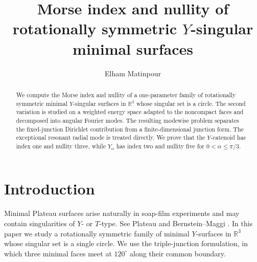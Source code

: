 \documentclass[11pt,twoside]{amsart}
\numberwithin{equation}{section}
\begin{document}

\pagestyle{myheadings}


\bigskip
\bigskip

\title{Morse index and nullity of rotationally symmetric \texorpdfstring{$Y$}{Y}-singular minimal surfaces}

\author{Elham Matinpour}
\address{Department of Mathematics, Johns Hopkins University, 3400 N. Charles Street, Baltimore, MD 21218}


\begin{abstract}
We compute the Morse index and nullity of a one-parameter family of rotationally symmetric minimal $Y$-singular surfaces in $\mathbb R^3$ whose singular set is a circle. The second variation is studied on a weighted energy space adapted to the noncompact faces and decomposed into angular Fourier modes. The resulting modewise problem separates the fixed-junction Dirichlet contribution from a finite-dimensional junction form. The exceptional resonant radial mode is treated directly. We prove that the $Y$-catenoid has index one and nullity three, while $Y_\alpha$ has index two and nullity five for $0<\alpha\leq\pi/3$.
\end{abstract}

\maketitle

\section{Introduction}
Minimal Plateau surfaces arise naturally in soap-film experiments and may contain singularities of $Y$- or $T$-type. See Plateau \cite{plateau1873statique} and Bernstein--Maggi \cite{bernstein2021symmetry}. In this paper we study a rotationally symmetric family of minimal $Y$-surfaces in $\mathbb R^3$ whose singular set is a single circle. We use the triple-junction formulation, in which three minimal faces meet at $120^\circ$ along their common boundary.
\end{document}
